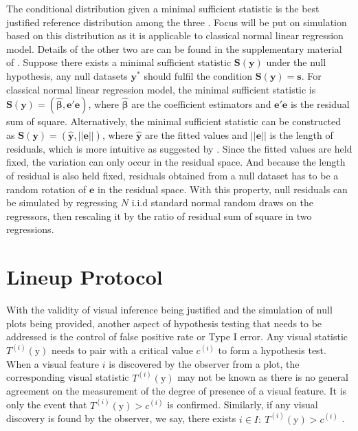 \documentclass{monashthesis}
\theoremstyle{definition}
\theoremstyle{definition}
\theoremstyle{definition}
\theoremstyle{definition}
\theoremstyle{remark}
\begin{document}
The conditional distribution given a minimal sufficient statistic is the best justified reference distribution among the three \autocite{buja_statistical_2009}. Focus will be put on simulation based on this distribution as it is applicable to classical normal linear regression model. Details of the other two are can be found in the supplementary material of \textcite{buja_statistical_2009}. Suppose there exists a minimal sufficient statistic \(\boldsymbol{S}(\boldsymbol{y})\) under the null hypothesis, any null datasets \(\boldsymbol{y^{*}}\) should fulfil the condition \(\boldsymbol{S}(\boldsymbol{y}) = \boldsymbol{s}\). For classical normal linear regression model, the minimal sufficient statistic is \(\boldsymbol{S}(\boldsymbol{y}) = (\hat{\boldsymbol{\beta}}, \boldsymbol{e}'\boldsymbol{e})\), where \(\hat{\boldsymbol{\beta}}\) are the coefficient estimators and \(\boldsymbol{e}'\boldsymbol{e}\) is the residual sum of square. Alternatively, the minimal sufficient statistic can be constructed as \(\boldsymbol{S}(\boldsymbol{y}) = (\hat{\boldsymbol{y}}, ||\boldsymbol{e}||)\), where \(\hat{\boldsymbol{y}}\) are the fitted values and \(||\boldsymbol{e}||\) is the length of residuals, which is more intuitive as suggested by \textcite{buja_statistical_2009}. Since the fitted values are held fixed, the variation can only occur in the residual space. And because the length of residual is also held fixed, residuals obtained from a null dataset has to be a random rotation of \(\boldsymbol{e}\) in the residual space. With this property, null residuals can be simulated by regressing \(N\) i.i.d standard normal random draws on the regressors, then rescaling it by the ratio of residual sum of square in two regressions.

\hypertarget{lineup-protocol}{%
\section{Lineup Protocol}\label{lineup-protocol}}

With the validity of visual inference being justified and the simulation of null plots being provided, another aspect of hypothesis testing that needs to be addressed is the control of false positive rate or Type I error. Any visual statistic \(T^{(i)}(\boldsymbol{\mathrm{y}})\) needs to pair with a critical value \(c^{(i)}\) to form a hypothesis test. When a visual feature \(i\) is discovered by the observer from a plot, the corresponding visual statistic \(T^{(i)}(\boldsymbol{\mathrm{y}})\) may not be known as there is no general agreement on the measurement of the degree of presence of a visual feature. It is only the event that \(T^{(i)}(\boldsymbol{\mathrm{y}}) > c^{(i)}\) is confirmed. Similarly, if any visual discovery is found by the observer, we say, there exists \(i \in I:~T^{(i)}(\boldsymbol{\mathrm{y}}) > c^{(i)}\) \autocite{buja_statistical_2009}.
\end{document}
